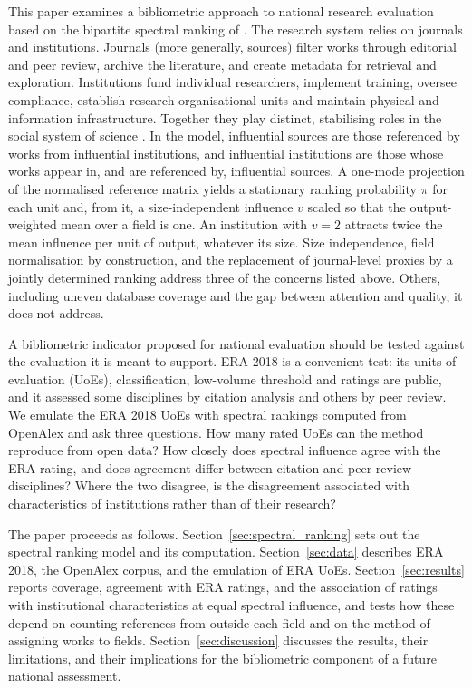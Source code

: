 This paper examines a bibliometric approach to national research evaluation based on the bipartite spectral ranking of \citet{docampodomingoRecirculatingCardinalSpectral2026}. The research system relies on journals and institutions. Journals (more generally, sources) filter works through editorial and peer review, archive the literature, and create metadata for retrieval and exploration. Institutions fund individual researchers, implement training, oversee compliance, establish research organisational units and maintain physical and information infrastructure. Together they play distinct, stabilising roles in the social system of science \citep{tahamtanSocialSystemsCitation2022}. In the model, influential sources are those referenced by works from influential institutions, and influential institutions are those whose works appear in, and are referenced by, influential sources. A one-mode projection \citep{breigerDualityPersonsGroups1974} of the normalised reference matrix yields a stationary ranking probability $\pi$ for each unit and, from it, a size-independent influence $v$ scaled so that the output-weighted mean over a field is one. An institution with $v = 2$ attracts twice the mean influence per unit of output, whatever its size. Size independence, field normalisation by construction, and the replacement of journal-level proxies by a jointly determined ranking address three of the concerns listed above. Others, including uneven database coverage and the gap between attention and quality, it does not address.

A bibliometric indicator proposed for national evaluation should be tested against the evaluation it is meant to support. ERA 2018 is a convenient test: its units of evaluation (UoEs), classification, low-volume threshold and ratings are public, and it assessed some disciplines by citation analysis and others by peer review. We emulate the ERA 2018 UoEs with spectral rankings computed from OpenAlex \citep{priemOpenAlexFullyopenIndex2022} and ask three questions. How many rated UoEs can the method reproduce from open data? How closely does spectral influence agree with the ERA rating, and does agreement differ between citation and peer review disciplines? Where the two disagree, is the disagreement associated with characteristics of institutions rather than of their research?

The paper proceeds as follows. Section~\ref{sec:spectral_ranking} sets out the spectral ranking model and its computation. Section~\ref{sec:data} describes ERA 2018, the OpenAlex corpus, and the emulation of ERA UoEs. Section~\ref{sec:results} reports coverage, agreement with ERA ratings, and the association of ratings with institutional characteristics at equal spectral influence, and tests how these depend on counting references from outside each field and on the method of assigning works to fields. Section~\ref{sec:discussion} discusses the results, their limitations, and their implications for the bibliometric component of a future national assessment.
